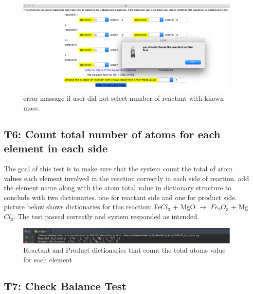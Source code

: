 \documentclass[12pt, titlepage]{article}
\begin{document}
\begin{figure}[H]
 \begin{center}
 \includegraphics [width=\textwidth]{reactantnumber}
 \caption{\label{ Figure 11:} error massage if user did not select number of reactant with known mass.}
 \end{center}
 \end{figure}

\subsection{T6: Count total number of atoms for each element in each side}

The goal of this test is to make sure that the system count the total of atom values each element involved in the reaction correctly in each side of reaction. add the element name along with the atom total value in dictionary structure to conclude with two dictionaries. one for reactant side and one for product side. picture below shows dictionaries for this reaction: Fe$Cl_3$ + MgO $\rightarrow$ $Fe_2$$O_3$ + Mg$Cl_2$. The test passed correctly and system responded as intended. 


\begin{figure}[H]
 \begin{center}
 \includegraphics [width=\textwidth]{beforebalance}
 \caption{\label{ Figure 12:} Reactant and Product dictionaries that count the total atoms value for each element}
 \end{center}
 \end{figure}
 
\subsection{T7: Check Balance Test}
\end{document}
